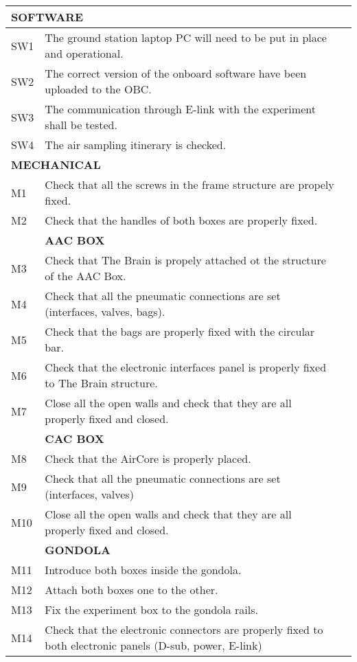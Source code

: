 \begin{longtable} {|m{}|m{}|m{}|}
\hline
\multicolumn{2}{|l|}{ \textbf{SOFTWARE} } & \\
\hline
SW1 & The ground station laptop PC will need to be put in place and operational. & \\
\hline
SW2 & The correct version of the onboard software have been uploaded to the OBC. & \\
\hline
SW3 & The communication through E-link with the experiment shall be tested. & \\
\hline
SW4 & The air sampling itinerary is checked. & \\
\hline
\multicolumn{2}{|l|}{ \textbf{MECHANICAL} } & \\
\hline
M1 & Check that all the screws in the frame structure are propely fixed. & \\
\hline
M2 & Check that the handles of both boxes are properly fixed. & \\
\hline
& \textbf{AAC BOX} & \\
\hline
M3 & Check that The Brain is propely attached ot the structure of the AAC Box. & \\
\hline
M4 & Check that all the pneumatic connections are set (interfaces, valves, bags). & \\
\hline
M5 & Check that the bags are properly fixed with the circular bar. & \\
\hline
M6 & Check that the electronic interfaces panel is properly fixed to The Brain structure. & \\
\hline
M7 & Close all the open walls and check that they are all properly fixed and closed. & \\
\hline
& \textbf{CAC BOX} & \\
\hline
M8 & Check that the AirCore is properly placed. & \\
\hline
M9 & Check that all the pneumatic connections are set (interfaces, valves) & \\
\hline
M10 & Close all the open walls and check that they are all properly fixed and closed. & \\
\hline
& \textbf{GONDOLA} & \\
\hline
M11 & Introduce both boxes inside the gondola. & \\
\hline
M12 & Attach both boxes one to the other. & \\
\hline
M13 & Fix the experiment box to the gondola rails. & \\
\hline
M14 & Check that the electronic connectors are properly fixed to both electronic panels (D-sub, power, E-link) & \\
\hline

\end{longtable}
